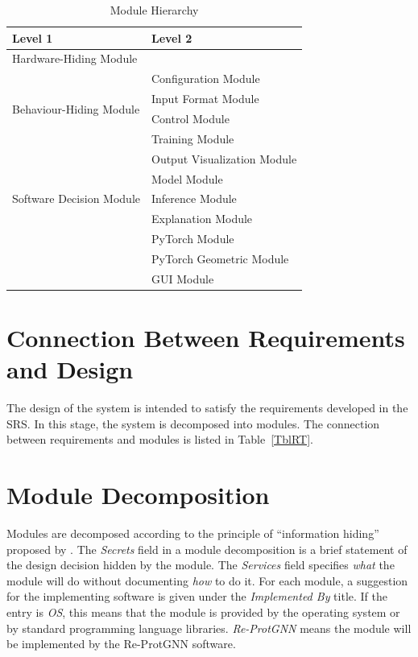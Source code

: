 \documentclass[12pt, titlepage]{article}
\begin{document}
\begin{table}[h!]
\centering
\begin{tabular}{p{} p{}}
\toprule
\textbf{Level 1} & \textbf{Level 2}\\
\midrule

{Hardware-Hiding Module} & ~ \\
\midrule

\multirow{4}{0.3\textwidth}{Behaviour-Hiding Module} 
& Configuration Module\\
& Input Format Module\\
& Control Module\\
& Training Module\\
& Output Visualization Module\\
\midrule

\multirow{3}{0.3\textwidth}{Software Decision Module} & {Model Module}\\
& Inference Module\\
& Explanation Module\\
& PyTorch Module\\
& PyTorch Geometric Module\\
& GUI Module\\
\bottomrule

\end{tabular}
\caption{Module Hierarchy}
\label{TblMH}
\end{table}

\section{Connection Between Requirements and Design} \label{SecConnection}

The design of the system is intended to satisfy the requirements developed in
the SRS. In this stage, the system is decomposed into modules. The connection
between requirements and modules is listed in Table~\ref{TblRT}.

\section{Module Decomposition} \label{SecMD}

Modules are decomposed according to the principle of ``information hiding''
proposed by \citet{ParnasEtAl1984}. The \emph{Secrets} field in a module
decomposition is a brief statement of the design decision hidden by the
module. The \emph{Services} field specifies \emph{what} the module will do
without documenting \emph{how} to do it. For each module, a suggestion for the
implementing software is given under the \emph{Implemented By} title. If the
entry is \emph{OS}, this means that the module is provided by the operating
system or by standard programming language libraries.  \emph{Re-ProtGNN} means the
module will be implemented by the Re-ProtGNN software.
\end{document}
